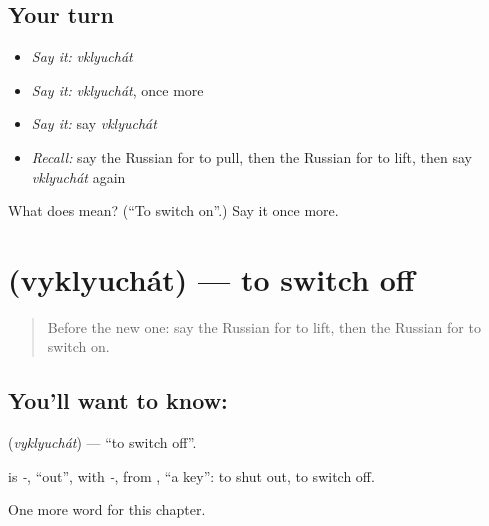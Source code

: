 \subsection*{Your turn}
\begin{itemize}
\raggedright
  \item \emph{Say it:} \emph{vklyuchát}
  \item \emph{Say it:} \emph{vklyuchát}, once more
  \item \emph{Say it:} say \emph{vklyuchát}
  \item \emph{Recall:} say the Russian for to pull, then the Russian for to lift, then say \emph{vklyuchát} again
\end{itemize}

\begin{tcolorbox}[breakable,colback=teal!4,colframe=teal!35!black,title={Before you move on}]
What does  mean? (\textquotedblleft{}To switch on\textquotedblright{}.) Say it once more.
\end{tcolorbox}
\section[\texorpdfstring{\ru{выключать} (vyklyuchát)}{выключать (vyklyuchát)}]{ (vyklyuchát) — to switch off}

\label{lesson:RU-C175-vyklyuchat}



\begin{quote}
Before the new one: say the Russian for to lift, then the Russian for to switch on.
\end{quote}

\subsection*{You'll want to know: }
\textbf{} (\emph{vyklyuchát}) — \textquotedblleft{}to switch off\textquotedblright{}.

\begin{cousinweb}
\textbf{} is \emph{-}, \textquotedblleft{}out\textquotedblright{}, with \emph{-}, from \emph{}, \textquotedblleft{}a key\textquotedblright{}: to shut out, to switch off.
\end{cousinweb}

\begin{grammarlens}[title={What you've built}]
One more word for this chapter.
\end{grammarlens}


